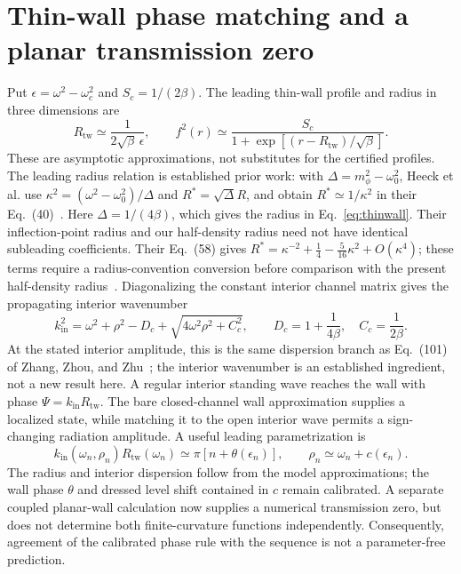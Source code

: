 \section{Thin-wall phase matching and a planar transmission zero}\label{sec:thinwall}
Put $\epsilon=\omega^2-\omega_c^2$ and $S_c=1/(2\beta)$.
The leading thin-wall profile and radius in three dimensions are
\begin{equation}\label{eq:thinwall}
R_{\mathrm{tw}}\simeq\frac{1}{2\sqrt\beta\,\epsilon},\qquad
f^2(r)\simeq\frac{S_c}{1+\exp[(r-R_{\mathrm{tw}})/\sqrt\beta]}.
\end{equation}
These are asymptotic approximations, not substitutes for the certified
profiles. The leading radius relation is established prior work: with
$\Delta=m_\phi^2-\omega_0^2$, Heeck et al. use
$\kappa^2=(\omega^2-\omega_0^2)/\Delta$ and
$R^*=\sqrt\Delta R$, and obtain $R^*\simeq1/\kappa^2$
in their Eq.~(40)~\cite{Heeck2021}.
Here $\Delta=1/(4\beta)$, which gives the radius in
Eq.~\eqref{eq:thinwall}. Their inflection-point radius and our
half-density radius need not have identical subleading coefficients.
Their Eq.~(58) gives
$R^*=\kappa^{-2}+\tfrac14-\tfrac{5}{16}\kappa^2+O(\kappa^4)$;
these terms require a radius-convention conversion before comparison
with the present half-density radius~\cite{Heeck2021}.
Diagonalizing the constant interior channel matrix gives the
propagating interior wavenumber
\begin{equation}\label{eq:interior}
k_{\mathrm{in}}^2=\omega^2+\rho^2-D_c+
 \sqrt{4\omega^2\rho^2+C_c^2},\qquad
D_c=1+\frac1{4\beta},\quad C_c=\frac1{2\beta}.
\end{equation}
At the stated interior amplitude, this is the same dispersion branch as
Eq.~(101) of Zhang, Zhou, and Zhu~\cite{ZhangZhouZhu2025}; the interior
wavenumber is an established ingredient, not a new result here.
A regular interior standing wave reaches the wall with phase
$\Psi=k_{\mathrm{in}}R_{\mathrm{tw}}$. The bare closed-channel wall approximation
supplies a localized state, while matching it to the open interior
wave permits a sign-changing radiation amplitude. A useful leading
parametrization is
\begin{equation}\label{eq:phase}
k_{\mathrm{in}}(\omega_n,\rho_n)R_{\mathrm{tw}}(\omega_n)
 \simeq\pi[n+\theta(\epsilon_n)],\qquad
\rho_n\simeq\omega_n+c(\epsilon_n).
\end{equation}
The radius and interior dispersion follow from the model approximations;
the wall phase $\theta$ and dressed level shift contained in $c$ remain
calibrated. A separate coupled planar-wall calculation now supplies a
numerical transmission zero, but does not determine both finite-curvature
functions independently. Consequently, agreement of the calibrated
phase rule with the sequence is not a parameter-free prediction.


